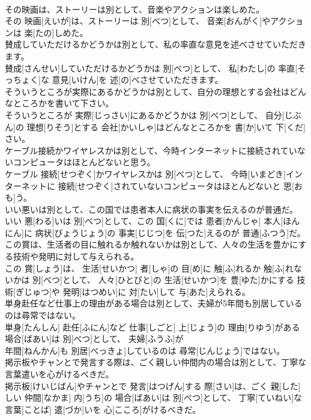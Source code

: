 \documentclass[8pt]{extreport}
\begin{document}
\begin{CJK}{UTF8}{min}
\\	その映画は、ストーリーは別として、音楽やアクションは楽しめた。	
\\	その 映画[えいが]は、ストーリーは 別[べつ]として、 音楽[おんがく]やアクションは 楽[たの]しめた。
\\	賛成していただけるかどうかは別として、私の率直な意見を述べさせていただきます。	
\\	賛成[さんせい]していただけるかどうかは 別[べつ]として、 私[わたし]の 率直[そっちょく]な 意見[いけん]を 述[の]べさせていただきます。
\\	そういうところが実際にあるかどうかは別として、自分の理想とする会社はどんなところかを書いて下さい。	
\\	そういうところが 実際[じっさい]にあるかどうかは 別[べつ]として、 自分[じぶん]の 理想[りそう]とする 会社[かいしゃ]はどんなところかを 書[か]いて 下[くだ]さい。
\\	ケーブル接続かワイヤレスかは別として、今時インターネットに接続されていないコンピュータはほとんどないと思う。	
\\	ケーブル 接続[せつぞく]かワイヤレスかは 別[べつ]として、 今時[いまどき]インターネットに 接続[せつぞく]されていないコンピュータはほとんどないと 思[おも]う。
\\	いい悪いは別として、この国では患者本人に病状の事実を伝えるのが普通だ。	
\\	いい 悪[わる]いは 別[べつ]として、この 国[くに]では 患者[かんじゃ] 本人[ほんにん]に 病状[びょうじょう]の 事実[じじつ]を 伝[つた]えるのが 普通[ふつう]だ。
\\	この賞は、生活者の目に触れるか触れないかは別として、人々の生活を豊かにする技術や発明に対して与えられる。	
\\	この 賞[しょう]は、 生活[せいかつ] 者[しゃ]の 目[め]に 触[ふ]れるか 触[ふ]れないかは 別[べつ]として、 人々[ひとびと]の 生活[せいかつ]を 豊[ゆた]かにする 技術[ぎじゅつ]や 発明[はつめい]に 対[たい]して 与[あた]えられる。
\\	単身赴任など仕事上の理由がある場合は別として、夫婦が5年間も別居しているのは尋常ではない。	
\\	単身[たんしん] 赴任[ふにん]など 仕事[しごと] 上[じょう]の 理由[りゆう]がある 場合[ばあい]は 別[べつ]として、 夫婦[ふうふ]が 
\\	年間[ねんかん]も 別居[べっきょ]しているのは 尋常[じんじょう]ではない。
\\	掲示板やチャンとで発言する際は、ごく親しい仲間内の場合は別として、丁寧な言葉遣いを心がけるべきだ。	
\\	掲示板[けいじばん]やチャンとで 発言[はつげん]する 際[さい]は、ごく 親[した]しい 仲間[なかま] 内[うち]の 場合[ばあい]は 別[べつ]として、 丁寧[ていねい]な 言葉[ことば] 遣[づか]いを 心[こころ]がけるべきだ。

\end{CJK}
\end{document}
